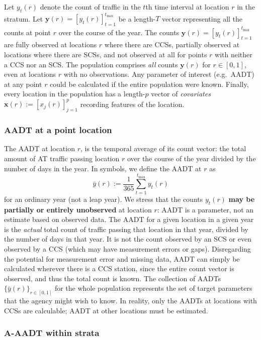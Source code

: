 \documentclass[11pt]{article}
\begin{document}
Let \(y_t(r)\) denote the count of traffic in the \(t\)th time interval
at location \(r\) in the stratum. Let
\(\mathbf{y}(r) = [y_t(r)]_{t=1}^{t_{\max}}\) be a length-\(T\) vector
representing all the counts at point \(r\) over the course of the year.
The counts \(\mathbf{y}(r) = [y_t(r)]_{t=1}^{t_{\max}}\) are fully
observed at locations \(r\) where there are CCSs, partially observed at
locations where there are SCSs, and not observed at all for points \(r\)
with neither a CCS nor an SCS. The population comprises \emph{all}
counts \(\mathbf{y}(r)\) for \(r \in [0, 1]\), even at locations \(r\)
with no observations. Any parameter of interest (e.g.~AADT) at any point
\(r\) could be calculated if the entire population were known. Finally,
every location in the population has a length-\(p\) vector of
\emph{covariates} \(\mathbf{x}(r) := [x_j(r)]_{j=1}^p\) recording
features of the location.

    \subsubsection{AADT at a point location}\label{aadt-at-a-point-location}

The AADT at location \(r\), is the temporal average of its count vector:
the total amount of AT traffic passing location \(r\) over the course of
the year divided by the number of days in the year. In symbols, we
define the AADT at \(r\) as \[
\bar{y}(r) := \frac{1}{365} \sum_{t=1}^{t_{\max}} y_t(r)
\] for an ordinary year (not a leap year). We stress that the counts
\(y_t(r)\) \textbf{may be partially or entirely unobserved} at location
\(r\): AADT is a parameter, not an estimate based on observed data. The
AADT for a given location in a given year is the \emph{actual} total
count of traffic passing that location in that year, divided by the
number of days in that year. It is not the count observed by an SCS or
even observed by a CCS (which may have measurement errors or gaps).
Disregarding the potential for measurement error and missing data, AADT
can simply be calculated wherever there is a CCS station, since the
entire count vector is observed, and thus the total count is known. The
collection of AADTs \(\{\bar{y}(r)\}_{r \in [0, 1]}\) for the whole
population represents the set of target parameters that the agency might
wish to know. In reality, only the AADTs at locations with CCSs are
calculable; AADT at other locations must be estimated.

    \subsubsection{A-AADT within strata}\label{a-aadt-within-strata}
\end{document}
